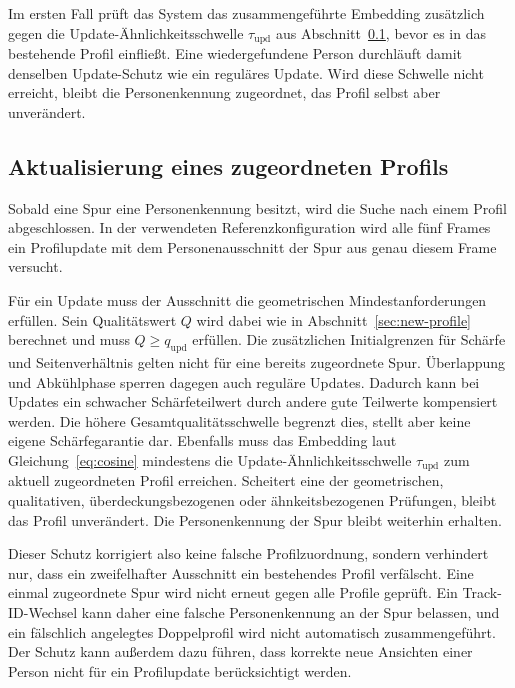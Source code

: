 \documentclass[runningheads,a4paper]{llncs}
\begin{document}
Im ersten Fall prüft das System das zusammengeführte Embedding zusätzlich gegen die Update-Ähnlichkeitsschwelle $\tau_{\mathrm{upd}}$ aus Abschnitt~\ref{sec:profile-update}, bevor es in das bestehende Profil einflie{\ss}t. Eine wiedergefundene Person durchläuft damit denselben Update-Schutz wie ein reguläres Update. Wird diese Schwelle nicht erreicht, bleibt die Personenkennung zugeordnet, das Profil selbst aber unverändert.

\subsection{Aktualisierung eines zugeordneten Profils}
\label{sec:profile-update}

Sobald eine Spur eine Personenkennung besitzt, wird die Suche nach einem Profil abgeschlossen. In der verwendeten Referenzkonfiguration wird alle fünf Frames ein Profilupdate mit dem Personenausschnitt der Spur aus genau diesem Frame versucht.

Für ein Update muss der Ausschnitt die geometrischen Mindestanforderungen erfüllen. Sein Qualitätswert $Q$ wird dabei wie in Abschnitt~\ref{sec:new-profile} berechnet und muss $Q\geq q_{\mathrm{upd}}$ erfüllen. Die zusätzlichen Initialgrenzen für Schärfe und Seitenverhältnis gelten nicht für eine bereits zugeordnete Spur. Überlappung und Abkühlphase sperren dagegen auch reguläre Updates. Dadurch kann bei Updates ein schwacher Schärfeteilwert durch andere gute Teilwerte kompensiert werden. Die höhere Gesamtqualitätsschwelle begrenzt dies, stellt aber keine eigene Schärfegarantie dar.
Ebenfalls muss das Embedding laut Gleichung~\ref{eq:cosine} mindestens die Update-Ähnlichkeitsschwelle $\tau_{\mathrm{upd}}$ zum aktuell zugeordneten Profil erreichen. Scheitert eine der geometrischen, qualitativen, überdeckungsbezogenen oder ähnkeitsbezogenen Prüfungen, bleibt das Profil unverändert. Die Personenkennung der Spur bleibt weiterhin erhalten.

Dieser Schutz korrigiert also keine falsche Profilzuordnung, sondern verhindert nur, dass ein zweifelhafter Ausschnitt ein bestehendes Profil verfälscht. Eine einmal zugeordnete Spur wird nicht erneut gegen alle Profile geprüft. Ein Track-ID-Wechsel kann daher eine falsche Personenkennung an der Spur belassen, und ein fälschlich angelegtes Doppelprofil wird nicht automatisch zusammengeführt. Der Schutz kann au{\ss}erdem dazu führen, dass korrekte neue Ansichten einer Person nicht für ein Profilupdate berücksichtigt werden.
\end{document}
